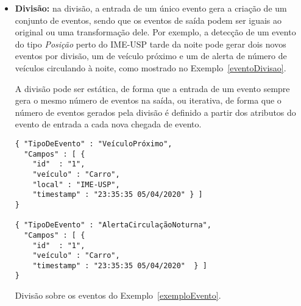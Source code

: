 \begin{itemize}
\item \textbf{Divisão:} na divisão, a entrada de um único evento gera a criação de um conjunto de eventos, sendo que os eventos de saída podem ser iguais ao original ou uma transformação dele. Por exemplo, a detecção de um evento do tipo \textit{Posição} perto do IME-USP tarde da noite pode gerar dois novos eventos por divisão, um de veículo próximo e um de alerta de número de veículos circulando à noite, como mostrado no Exemplo~\ref{eventoDivisao}.

A divisão pode ser estática, de forma que a entrada de um evento sempre gera o mesmo número de eventos na saída, ou iterativa, de forma que o número de eventos gerados pela divisão é definido a partir dos atributos do evento de entrada a cada nova chegada de evento. 

\begin{evento}[h]
\begin{verbatim}
{ "TipoDeEvento" : "VeículoPróximo",
  "Campos" : [ {
    "id"  : "1",
    "veículo" : "Carro",
    "local" : "IME-USP",
    "timestamp" : "23:35:35 05/04/2020" } ]
}

{ "TipoDeEvento" : "AlertaCirculaçãoNoturna",
  "Campos" : [ {
    "id"  : "1",
    "veículo" : "Carro",
    "timestamp" : "23:35:35 05/04/2020"  } ]
}
\end{verbatim}
\caption{Divisão sobre os eventos do Exemplo~\ref{exemploEvento}.}
\label{eventoDivisao}
\end{evento}




\end{itemize}
